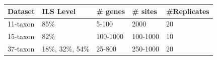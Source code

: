 \setlength\LTleft{-0.5cm}%
\setlength{}%
\begin{table}[H]
    \centering
    \caption{Properties of the simulated datasets. Level of ILS is presented in terms of the average topological distance between true gene trees and true species tree}
    \label{tab:datasets}
    \begin{longtable}{|p{3 cm}|p{3 cm}|p{3 cm}|p{3 cm}|p{3 cm}|}
    \hline
    \textbf{Dataset} & \textbf{ILS Level} & \textbf{\# genes} & \textbf{\# sites} & \textbf{\#Replicates}\\ \hline
    11-taxon & 85\% & 5-100 & 2000 & 20\\ \hline
    15-taxon & 82\% & 100-1000 & 100-1000 & 10 \\ \hline 
    37-taxon & 18\%, 32\%, 54\% & 25-800 & 250-1000 & 20 \\ \hline
    \end{longtable}

\end{table}
